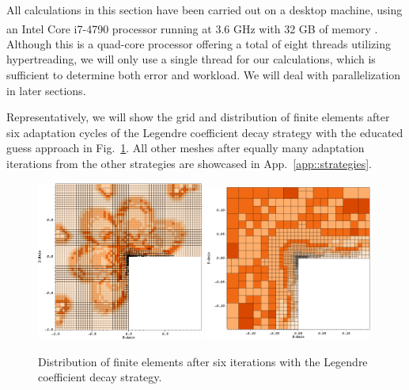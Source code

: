 All calculations in this section have been carried out on a desktop machine, using an Intel\textsuperscript{\textregistered} Core\textsuperscript{\texttrademark} i7-4790 processor running at 3.6 GHz with 32 GB of memory . Although this is a quad-core processor offering a total of eight threads utilizing hypertreading, we will only use a single thread for our calculations, which is sufficient to determine both error and workload. We will deal with parallelization in later sections.



Representatively, we will show the grid and distribution of finite elements after six adaptation cycles of the Legendre coefficient decay strategy with the educated guess approach in Fig.~\ref{fig:fedegrees}. All other meshes after equally many adaptation iterations from the other strategies are showcased in App.~\ref{app::strategies}.

\begin{figure}
\centering
\includegraphics[width=0.49\textwidth]{figures/results/corner-2d-error-hp-legendre-05_fedegrees.png}
\includegraphics[width=0.49\textwidth]{figures/results/corner-2d-error-hp-legendre-05_fedegrees_zoom.png}
\caption{Distribution of finite elements after six iterations with the Legendre coefficient decay strategy.}
\label{fig:fedegrees}
\end{figure}

